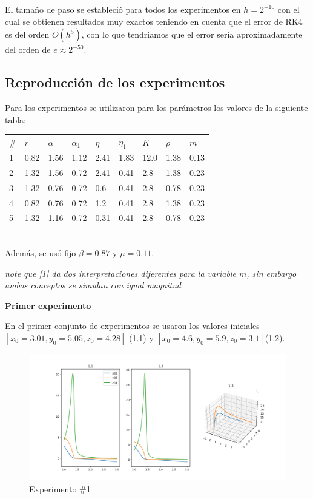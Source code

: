 \documentclass{wscpaperproc}
\theoremstyle{wsc}
\begin{document}
El tamaño de paso se estableció para todos los experimentos en
$h=2^{-10}$ con el cual se obtienen resultados muy exactos teniendo
en cuenta que el error de RK4 es del orden $O(h^5)$, con lo que tendriamos
que el error sería aproximadamente del orden de $e \approx 2^{-50}$.

\subsection*{Reproducción de los experimentos}

Para los experimentos se utilizaron para los parámetros los valores de la siguiente tabla:

\begin{tabular}{p{1cm} | p{1cm} | p{1cm} | p{1cm} | p{1cm} | p{1cm} | p{1cm} | p{1cm} | p{1cm} }
	$\#$ & $r$  & $\alpha$ & $\alpha_1$ & $\eta$ & $\eta_1$ & $K$  & $\rho$ & $m$  \\
	1    & 0.82 & 1.56     & 1.12       & 2.41   & 1.83     & 12.0 & 1.38   & 0.13 \\
	2    & 1.32 & 1.56     & 0.72       & 2.41   & 0.41     & 2.8  & 1.38   & 0.23 \\
	3    & 1.32 & 0.76     & 0.72       & 0.6    & 0.41     & 2.8  & 0.78   & 0.23 \\
	4    & 0.82 & 0.76     & 0.72       & 1.2    & 0.41     & 2.8  & 1.38   & 0.23 \\
	5    & 1.32 & 1.16     & 0.72       & 0.31   & 0.41     & 2.8  & 0.78   & 0.23 \\
\end{tabular}
\\

Además, se usó fijo $\beta=0.87$ y $\mu=0.11$.

{\it note que [1] da dos interpretaciones diferentes para la variable $m$, sin embargo ambos conceptos se simulan con igual magnitud}

\vspace*{0.5cm}
{\bf Primer experimento}

En el primer conjunto de experimentos se usaron los valores iniciales $[x_0=3.01, y_0=5.05, z_0=4.28]$ (1.1)
y $[x_0=4.6, y_0=5.9, z_0=3.1]$(1.2).

\begin{figure}[h!]
	\includegraphics[width=\linewidth]{./images/1.png}
	\caption{Experimento \#1}
\end{figure}
\end{document}
